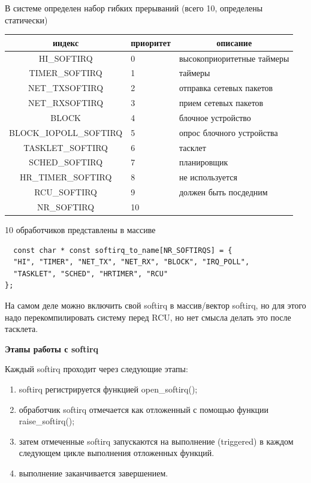 В системе определен набор гибких прерываний (всего 10, определены статически)
\begin{table}[H]
\begin{center}
\begin{tabular}{|c|l|l|}
\hline
индекс                                                           & \multicolumn{1}{c|}{приоритет}                                                               & \multicolumn{1}{c|}{описание}      \\ \hline
HI\_SOFTIRQ & 0 & высокоприоритетные таймеры \\ \hline
TIMER\_SOFTIRQ  & 1 & таймеры\\ \hline
NET\_TXSOFTIRQ & 2 & отправка сетевых пакетов\\ \hline
NET\_RXSOFTIRQ & 3 & прием сетевых пакетов \\ \hline
BLOCK & 4 & блочное устройство \\ \hline
BLOCK\_IOPOLL\_SOFTIRQ & 5 & опрос блочного устройства \\ \hline
TASKLET\_SOFTIRQ & 6 & тасклет \\ \hline
SCHED\_SOFTIRQ & 7 & планировщик \\ \hline
HR\_TIMER\_SOFTIRQ & 8 & не используется \\ \hline
RCU\_SOFTIRQ & 9 & должен быть посдедним \\ \hline
NR\_SOFTIRQ & 10 &  \\ \hline
\end{tabular}
\end{center}
\end{table}

10 обработчиков представлены в массиве

\begin{lstlisting}
  const char * const softirq_to_name[NR_SOFTIRQS] = {
  "HI", "TIMER", "NET_TX", "NET_RX", "BLOCK", "IRQ_POLL",
  "TASKLET", "SCHED", "HRTIMER", "RCU"
};
\end{lstlisting}

На самом деле можно включить свой softirq в массив/вектор softirq, но для этого надо перекомпилировать систему перед RCU, но нет смысла делать это после тасклета.

\textbf{Этапы работы с softirq}

Каждый softirq проходит через следующие этапы:

\begin{enumerate}
        \item softirq регистрируется функцией open\_softirq();           
  \item обработчик softirq отмечается как отложенный с помощью функции raise\_softirq();
  \item затем отмеченные softirq запускаются на выполнение (triggered) в каждом следующем цикле выполнения отложенных функций.
  \item выполнение заканчивается завершением.
        
\end{enumerate}

